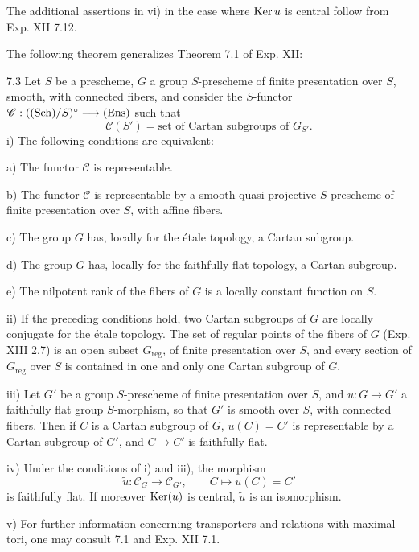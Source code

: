 The additional assertions in vi) in the case where $\operatorname{Ker} u$ is central follow from Exp. XII 7.12.

The following theorem generalizes Theorem 7.1 of Exp. XII:
\begin{theorem}{7.3}\label{XV.7.3}
Let $S$ be a prescheme, $G$ a group $S$-prescheme of finite presentation over $S$, smooth, with connected fibers, and consider the $S$-functor $\mathscr C:(\textup{(Sch)}/S)^\circ\longrightarrow\textup{(Ens)}$ such that
\[
\mathscr C(S')=\text{set of Cartan subgroups of }G_{S'}.
\]
\noindent i) The following conditions are equivalent:

\noindent\hspace*{1em}a) The functor $\mathscr C$ is representable.

\noindent\hspace*{1em}b) The functor $\mathscr C$ is representable by a smooth quasi-projective $S$-prescheme of finite presentation over $S$, with affine fibers.

\noindent\hspace*{1em}c) The group $G$ has, locally for the étale topology, a Cartan subgroup.

\noindent\hspace*{1em}d) The group $G$ has, locally for the faithfully flat topology, a Cartan subgroup.

\noindent\hspace*{1em}e) The nilpotent rank of the fibers of $G$ is a locally constant function on $S$.

\noindent ii) If the preceding conditions hold, two Cartan subgroups of $G$ are locally conjugate for the étale topology. The set of regular points of the fibers of $G$ (Exp. XIII 2.7) is an open subset $G_{\mathrm{reg}}$, of finite presentation over $S$, and every section of $G_{\mathrm{reg}}$ over $S$ is contained in one and only one Cartan subgroup of $G$.

\noindent iii) Let $G'$ be a group $S$-prescheme of finite presentation over $S$, and $u:G\to G'$ a faithfully flat group $S$-morphism, so that $G'$ is smooth over $S$, with connected fibers. Then if $C$ is a Cartan subgroup of $G$, $u(C)=C'$ is representable by a Cartan subgroup of $G'$, and $C\to C'$ is faithfully flat.

\noindent iv) Under the conditions of i) and iii), the morphism
\[
\widetilde u:\mathscr C_G\longrightarrow\mathscr C_{G'},\qquad C\longmapsto u(C)=C'
\]
is faithfully flat. If moreover $\operatorname{Ker}(u)$ is central, $\widetilde u$ is an isomorphism.

\noindent v) For further information concerning transporters and relations with maximal tori, one may consult 7.1 and Exp. XII 7.1.
\end{theorem}
